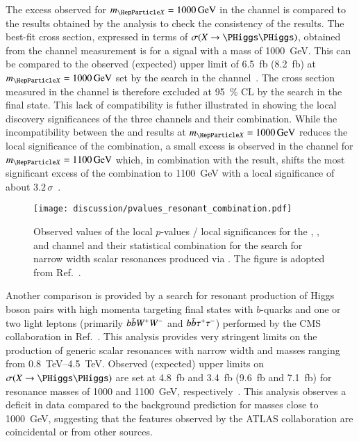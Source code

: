 The excess observed for $\mX = \SI{1000}{\GeV}$ in the \bbtautau
channel is compared to the results obtained by the \bbbb analysis to
check the consistency of the results. The best-fit cross section,
expressed in terms of $\sigma(X \to \HH)$, obtained from the \bbtautau
channel measurement is  for a
signal with a mass of \SI{1000}{\GeV}. This can be compared to the
observed (expected) upper limit of \SI{6.5}{\femto\barn}
(\SI{8.2}{\femto\barn}) at $\mX = \SI{1000}{\GeV}$ set by the search
in the \bbbb channel~\cite{HDBS-2018-41,hepdata.111124}. The cross
section measured in the \bbtautau channel is therefore excluded at
\SI{95}{\percent} CL by the search in the \bbbb final state. This lack
of compatibility is futher illustrated in
 showing the local discovery
significances of the three channels and their combination. While the
incompatibility between the \bbtautau and \bbbb results at
$\mX = \SI{1000}{\GeV}$ reduces the local significance of the
combination, a small excess is observed in the \bbbb channel for
$\mX = \SI{1100}{\GeV}$ which, in combination with the \bbtautau
result, shifts the most significant excess of the combination to
\SI{1100}{\GeV} with a local significance of about
$3.2\,\sigma$~\cite{ATLAS-CONF-2021-052}.


\begin{figure}[htbp]
  \centering

  \texttt{[image: discussion/pvalues\_resonant\_combination.pdf]}

  \caption{Observed values of the local $p$-values / local
    significances for the \bbbb, \bbtautau, and \bbyy channel and
    their statistical combination for the search for narrow width
    scalar resonances produced via \ggF. The figure is adopted from
    Ref.~\cite{ATLAS-CONF-2021-052}.}
  \label{fig:resonant_hh_comb_pvalues}

\end{figure}

Another comparison is provided by a search for resonant production of
Higgs boson pairs with high momenta targeting final states with
$b$-quarks and one or two light leptons (primarily $b\bar{b} W^+ W^-$
and $b\bar{b} \tau^+ \tau^-$) performed by the CMS collaboration in
Ref.~\cite{CMS-B2G-20-007}. This analysis provides very stringent
limits on the production of generic scalar resonances with narrow
width and masses ranging from \SIrange{0.8}{4.5}{\TeV}. Observed
(expected) upper limits on $\sigma(X \to \HH)$ are set at
\SI{4.8}{\femto\barn} and \SI{3.4}{\femto\barn} (\SI{9.6}{\femto\barn}
and \SI{7.1}{\femto\barn}) for resonance masses of \num{1000} and
\SI{1100}{\GeV},
respectively~\cite{CMS-B2G-20-007,hepdata.115024}. This analysis
observes a deficit in data compared to the background prediction for
masses close to \SI{1000}{\GeV}, suggesting that the features observed
by the ATLAS collaboration are coincidental or from other sources.

